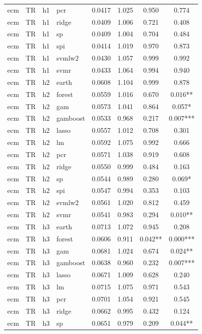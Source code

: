 \begin{ThreePartTable}
\begin{longtable}[t]{llclcccc}
ecm & TR & h1 & pcr & 0.0417 & 1.025 & 0.950 & 0.774\\
ecm & TR & h1 & ridge & 0.0409 & 1.006 & 0.721 & 0.408\\
ecm & TR & h1 & sp & 0.0409 & 1.004 & 0.704 & 0.484\\
ecm & TR & h1 & spi & 0.0414 & 1.019 & 0.970 & 0.873\\
ecm & TR & h1 & svmlw2 & 0.0430 & 1.057 & 0.999 & 0.992\\
ecm & TR & h1 & svmr & 0.0433 & 1.064 & 0.994 & 0.940\\
\addlinespace
ecm & TR & h2 & earth & 0.0608 & 1.104 & 0.999 & 0.878\\
ecm & TR & h2 & forest & 0.0559 & 1.016 & 0.670 & 0.016**\\
ecm & TR & h2 & gam & 0.0573 & 1.041 & 0.864 & 0.057*\\
ecm & TR & h2 & gamboost & 0.0533 & 0.968 & 0.217 & 0.007***\\
ecm & TR & h2 & lasso & 0.0557 & 1.012 & 0.708 & 0.301\\
ecm & TR & h2 & lm & 0.0592 & 1.075 & 0.992 & 0.666\\
ecm & TR & h2 & pcr & 0.0571 & 1.038 & 0.919 & 0.608\\
ecm & TR & h2 & ridge & 0.0550 & 0.999 & 0.484 & 0.163\\
ecm & TR & h2 & sp & 0.0544 & 0.989 & 0.280 & 0.069*\\
ecm & TR & h2 & spi & 0.0547 & 0.994 & 0.353 & 0.103\\
ecm & TR & h2 & svmlw2 & 0.0561 & 1.020 & 0.812 & 0.459\\
ecm & TR & h2 & svmr & 0.0541 & 0.983 & 0.294 & 0.010**\\
\addlinespace
ecm & TR & h3 & earth & 0.0713 & 1.072 & 0.945 & 0.208\\
ecm & TR & h3 & forest & 0.0606 & 0.911 & 0.042** & 0.000***\\
ecm & TR & h3 & gam & 0.0681 & 1.024 & 0.674 & 0.024**\\
ecm & TR & h3 & gamboost & 0.0638 & 0.960 & 0.232 & 0.007***\\
ecm & TR & h3 & lasso & 0.0671 & 1.009 & 0.628 & 0.240\\
ecm & TR & h3 & lm & 0.0715 & 1.075 & 0.971 & 0.543\\
ecm & TR & h3 & pcr & 0.0701 & 1.054 & 0.921 & 0.545\\
ecm & TR & h3 & ridge & 0.0662 & 0.995 & 0.432 & 0.124\\
ecm & TR & h3 & sp & 0.0651 & 0.979 & 0.209 & 0.044**\\

\end{longtable}
\end{ThreePartTable}
